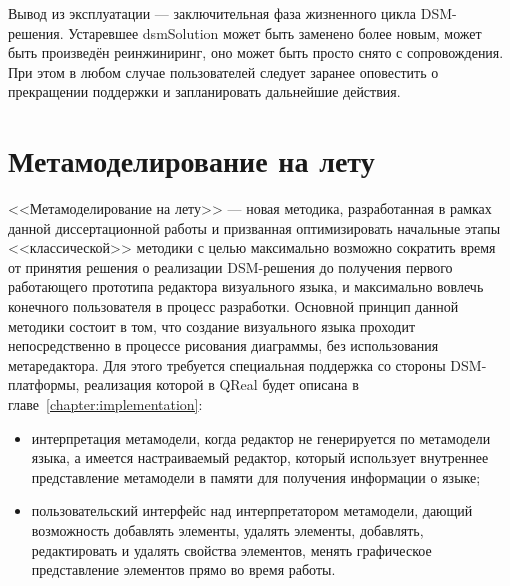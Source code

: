 Вывод из эксплуатации --- заключительная фаза жизненного цикла \ac{DSM}-решения. Устаревшее 
\ac{dsmSolution} может быть заменено более новым, может быть произведён реинжиниринг, оно 
может быть просто снято с сопровождения. При этом в любом случае пользователей следует 
заранее оповестить о прекращении поддержки и запланировать дальнейшие действия.

\section{Метамоделирование на лету}
\label{chapter:metamodelingOnFly}
<<Метамоделирование на лету>> --- новая методика, разработанная в рамках данной 
диссертационной работы и призванная оптимизировать начальные этапы <<классической>> 
методики с целью максимально возможно сократить время от принятия решения о реализации 
\ac{DSM}-решения до получения первого работающего прототипа редактора визуального языка, 
и максимально вовлечь конечного пользователя в процесс разработки. Основной принцип 
данной методики состоит в том, что создание визуального языка проходит непосредственно 
в процессе рисования диаграммы, без использования метаредактора. Для этого требуется 
специальная поддержка со стороны \ac{DSM}-платформы, реализация которой в QReal будет описана 
в главе~\ref{chapter:implementation}:
\begin{itemize}
	\item интерпретация метамодели, когда редактор не генерируется по метамодели языка, 
		а имеется настраиваемый редактор, который использует внутреннее представление 
		метамодели в памяти для получения информации о языке;
	\item пользовательский интерфейс над интерпретатором метамодели, дающий возможность 
		добавлять элементы, удалять элементы, добавлять, редактировать и удалять свойства 
		элементов, менять графическое представление элементов прямо во время работы.
\end{itemize}

